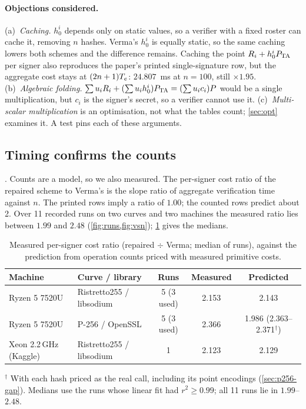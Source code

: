 \paragraph{Objections considered.}
(a)~\emph{Caching.} $h_0^i$ depends only on static values, so a verifier with a fixed roster can cache
it, removing $n$ hashes. Verma's $h_0^i$ is equally static, so the same caching lowers both schemes and
the difference remains. Caching the point $R_i+h_0^iP_{\mathrm{TA}}$ per signer also reproduces the paper's printed
single-signature row, but the aggregate cost stays at $(2n+1)T_{e}$: $24.807$~ms at $n=100$, still
$\times1.95$. (b)~\emph{Algebraic folding.} $\sum u_iR_i+(\sum u_ih_0^i)P_{\mathrm{TA}}=(\sum u_ic_i)P$ would be a
single multiplication, but $c_i$ is the signer's secret, so a verifier cannot use it. (c)~\emph{Multi-scalar
multiplication} is an optimisation, not what the tables count; \cref{sec:opt} examines it. A test pins
each of these arguments.

\subsection{Timing confirms the counts}
. Counts are a model, so we also measured. The per-signer cost ratio of the repaired
scheme to Verma's is the slope ratio of aggregate verification time against $n$. The printed rows imply
a ratio of $1.00$; the counted rows predict about 2. Over 11 recorded runs on two curves and two machines
the measured ratio lies between $1.99$ and $2.48$ (\cref{fig:runs,fig:vsn}); \cref{tab:timing} gives the
medians.

\begin{table}[ht]
\centering\small
\caption{Measured per-signer cost ratio (repaired $\div$ Verma; median of runs), against the prediction
from operation counts priced with measured primitive costs.}\label{tab:timing}
\begin{tabular}{llccc}
\toprule
Machine & Curve / library & Runs & Measured & Predicted \\
\midrule
Ryzen 5 7520U & Ristretto255 / libsodium & 5 (3 used) & 2.153 & 2.143 \\
Ryzen 5 7520U & P-256 / OpenSSL & 5 (3 used) & 2.366 & 1.986 (2.363--2.371$^{\dagger}$) \\
Xeon 2.2\,GHz (Kaggle) & Ristretto255 / libsodium & 1 & 2.123 & 2.129 \\
\bottomrule
\end{tabular}

\smallskip
\footnotesize $^{\dagger}$ With each hash priced as the real call, including its point encodings
(\cref{sec:p256-gap}). Medians use the runs whose linear fit had $r^2\ge0.99$; all 11 runs lie in $1.99$--$2.48$.
\end{table}

